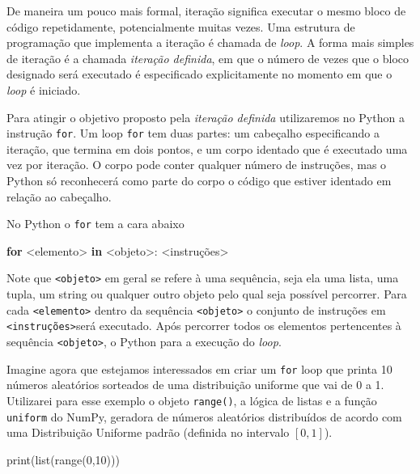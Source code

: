 \documentclass[
  brazilian,
  letterpaper,
  DIV=11,
  numbers=noendperiod]{scrreprt}
\newenvironment{Shaded}{\begin{snugshade}}{\end{snugshade}}
\newcommand{\BuiltInTok}[1]{\textcolor[rgb]{0.00,0.23,0.31}{#1}}
\newcommand{\ControlFlowTok}[1]{\textcolor[rgb]{0.00,0.23,0.31}{\textbf{#1}}}
\newcommand{\DecValTok}[1]{\textcolor[rgb]{0.68,0.00,0.00}{#1}}
\newcommand{\KeywordTok}[1]{\textcolor[rgb]{0.00,0.23,0.31}{\textbf{#1}}}
\newcommand{\NormalTok}[1]{\textcolor[rgb]{0.00,0.23,0.31}{#1}}
\newcommand{\OperatorTok}[1]{\textcolor[rgb]{0.37,0.37,0.37}{#1}}
\begin{document}
De maneira um pouco mais formal, iteração significa executar o mesmo
bloco de código repetidamente, potencialmente muitas vezes. Uma
estrutura de programação que implementa a iteração é chamada de
\emph{loop}. A forma mais simples de iteração é a chamada \emph{iteração
definida}, em que o número de vezes que o bloco designado será executado
é especificado explicitamente no momento em que o \emph{loop} é
iniciado.

Para atingir o objetivo proposto pela \emph{iteração definida}
utilizaremos no Python a instrução \texttt{for}. Um loop \texttt{for}
tem duas partes: um cabeçalho especificando a iteração, que termina em
dois pontos, e um corpo identado que é executado uma vez por iteração. O
corpo pode conter qualquer número de instruções, mas o Python só
reconhecerá como parte do corpo o código que estiver identado em relação
ao cabeçalho.

No Python o \texttt{for} tem a cara abaixo

\begin{Shaded}
\begin{Highlighting}[]
\ControlFlowTok{for} \OperatorTok{\textless{}}\NormalTok{elemento}\OperatorTok{\textgreater{}} \KeywordTok{in} \OperatorTok{\textless{}}\NormalTok{objeto}\OperatorTok{\textgreater{}}\NormalTok{:}
    \OperatorTok{\textless{}}\NormalTok{instruções}\OperatorTok{\textgreater{}}
\end{Highlighting}
\end{Shaded}

Note que \texttt{\textless{}objeto\textgreater{}} em geral se refere à
uma sequência, seja ela uma lista, uma tupla, um string ou qualquer
outro objeto pelo qual seja possível percorrer. Para cada
\texttt{\textless{}elemento\textgreater{}} dentro da sequência
\texttt{\textless{}objeto\textgreater{}} o conjunto de instruções em
\texttt{\textless{}instruções\textgreater{}}será executado. Após
percorrer todos os elementos pertencentes à sequência
\texttt{\textless{}objeto\textgreater{}}, o Python para a execução do
\emph{loop}.

Imagine agora que estejamos interessados em criar um \texttt{for} loop
que printa 10 números aleatórios sorteados de uma distribuição uniforme
que vai de 0 a 1. Utilizarei para esse exemplo o objeto
\texttt{range()}, a lógica de listas e a função \texttt{uniform} do
NumPy, geradora de números aleatórios distribuídos de acordo com uma
Distribuição Uniforme padrão (definida no intervalo \([0,1]\)).

\begin{Shaded}
\begin{Highlighting}[]
\BuiltInTok{print}\NormalTok{(}\BuiltInTok{list}\NormalTok{(}\BuiltInTok{range}\NormalTok{(}\DecValTok{0}\NormalTok{,}\DecValTok{10}\NormalTok{)))}
\end{Highlighting}
\end{Shaded}
\end{document}
